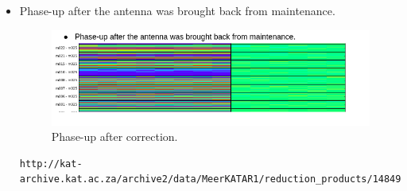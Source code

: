 \documentclass{article}
\begin{document}
{\begin{appendices}
\begin{itemize}
\begin{lstlisting}
\end{lstlisting}




\subsection{M025 status after maintenance and connection on the 21 Jan 2017}:
Basic Functionality Pointing report after the antenna was brought back from maintenance. 

\begin{lstlisting}
http://kat-archive.kat.ac.za/archive2/data/MeerKATAR1/reduction_products/1485276360/obs_report_1485274430.h5.html

\end{lstlisting}



\item Phase-up after the antenna was brought back from maintenance.
\begin{figure}[H]
	\centering
	\includegraphics[scale=0.33]{m025_phaseup_after.png}
	
	\caption{Phase-up after correction.}
	\label{fig:tilt1}
\end{figure}

\begin{lstlisting}
http://kat-archive.kat.ac.za/archive2/data/MeerKATAR1/reduction_products/1484997010/obs_report_1484996150.h5.html
\end{lstlisting}






\end{itemize}
\end{appendices}}
\end{document}
